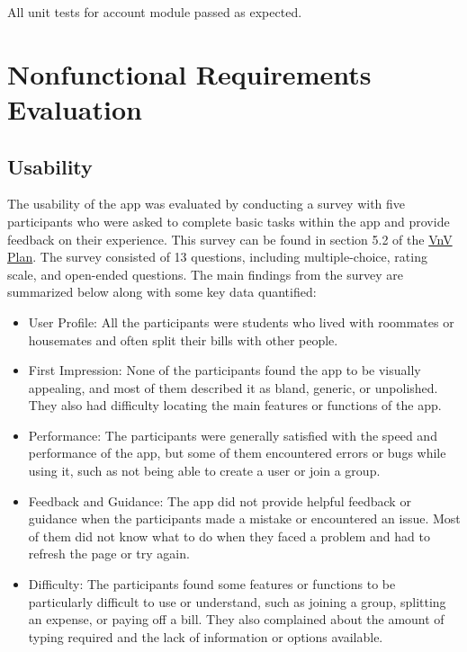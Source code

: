 \documentclass[12pt, titlepage]{article}
\begin{document}
All unit tests for account module passed as expected.


\section{Nonfunctional Requirements Evaluation}

\subsection{Usability}
The usability of the app was evaluated by conducting a survey with five participants who were asked to complete basic tasks within the app and provide feedback on their experience. This survey can be found in section 5.2 of the \href{https://github.com/DangJustin/CapstoneProject/blob/main/docs/VnVPlan/VnVPlan.pdf}{VnV Plan}. The survey consisted of 13 questions, including multiple-choice, rating scale, and open-ended questions. The main findings from the survey are summarized below along with some key data quantified:

\begin{itemize}
    \item User Profile: All the participants were students who lived with roommates or housemates and often split their bills with other people.
    \item First Impression: None of the participants found the app to be visually appealing, and most of them described it as bland, generic, or unpolished. They also had difficulty locating the main features or functions of the app.
    \item Performance: The participants were generally satisfied with the speed and performance of the app, but some of them encountered errors or bugs while using it, such as not being able to create a user or join a group.
    \item Feedback and Guidance: The app did not provide helpful feedback or guidance when the participants made a mistake or encountered an issue. Most of them did not know what to do when they faced a problem and had to refresh the page or try again.
    \item Difficulty: The participants found some features or functions to be particularly difficult to use or understand, such as joining a group, splitting an expense, or paying off a bill. They also complained about the amount of typing required and the lack of information or options available.
\end{itemize}
\end{document}
